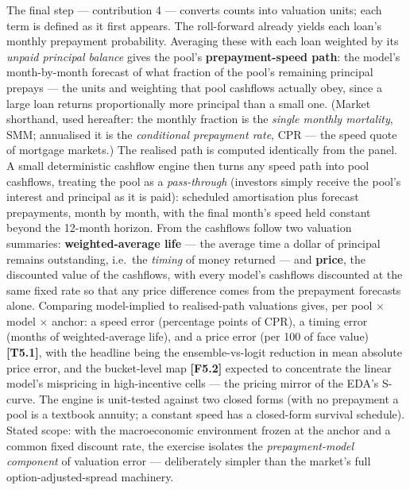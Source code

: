 \documentclass[11pt,a4paper]{article}
\newcommand{\artifact}[1]{\textbf{[#1]}}
\begin{document}
The final step --- contribution 4 --- converts counts into valuation units; each term is defined as it first appears. The roll-forward already yields each loan's monthly prepayment probability. Averaging these with each loan weighted by its \emph{unpaid principal balance} gives the pool's \textbf{prepayment-speed path}: the model's month-by-month forecast of what fraction of the pool's remaining principal prepays --- the units and weighting that pool cashflows actually obey, since a large loan returns proportionally more principal than a small one. (Market shorthand, used hereafter: the monthly fraction is the \emph{single monthly mortality}, SMM; annualised it is the \emph{conditional prepayment rate}, CPR --- the speed quote of mortgage markets.) The realised path is computed identically from the panel. A small deterministic cashflow engine then turns any speed path into pool cashflows, treating the pool as a \emph{pass-through} (investors simply receive the pool's interest and principal as it is paid): scheduled amortisation plus forecast prepayments, month by month, with the final month's speed held constant beyond the 12-month horizon. From the cashflows follow two valuation summaries: \textbf{weighted-average life} --- the average time a dollar of principal remains outstanding, i.e.\ the \emph{timing} of money returned --- and \textbf{price}, the discounted value of the cashflows, with every model's cashflows discounted at the same fixed rate so that any price difference comes from the prepayment forecasts alone. Comparing model-implied to realised-path valuations gives, per pool $\times$ model $\times$ anchor: a speed error (percentage points of CPR), a timing error (months of weighted-average life), and a price error (per 100 of face value) \artifact{T5.1}, with the headline being the ensemble-vs-logit reduction in mean absolute price error, and the bucket-level map \artifact{F5.2} expected to concentrate the linear model's mispricing in high-incentive cells --- the pricing mirror of the EDA's S-curve. The engine is unit-tested against two closed forms (with no prepayment a pool is a textbook annuity; a constant speed has a closed-form survival schedule). Stated scope: with the macroeconomic environment frozen at the anchor and a common fixed discount rate, the exercise isolates the \emph{prepayment-model component} of valuation error --- deliberately simpler than the market's full option-adjusted-spread machinery.
\end{document}
